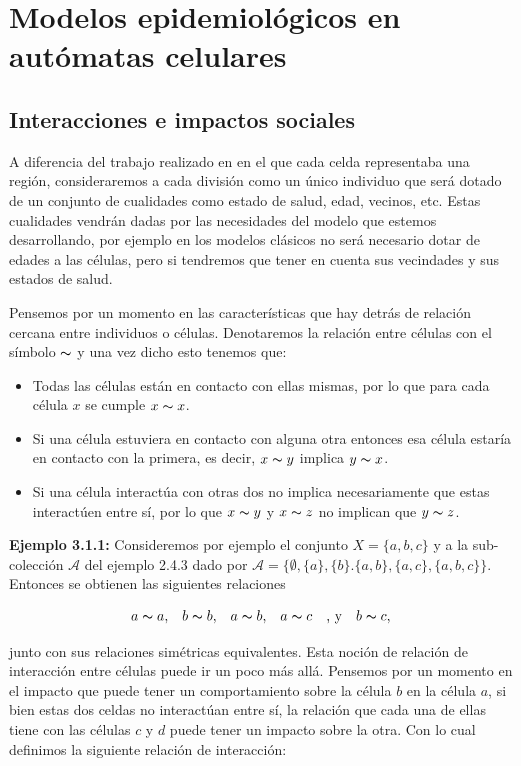\chapter{Modelos epidemiológicos en autómatas celulares}\label{ch:Modelos epidemiológicos en AC}

\section{Interacciones e impactos sociales}
A diferencia del trabajo realizado en \cite{populationDensity} en el que cada celda representaba una región, consideraremos a cada división como un único individuo que será dotado de un conjunto de cualidades como estado de salud, edad, vecinos, etc. Estas cualidades vendrán dadas por las necesidades del modelo que estemos desarrollando, por ejemplo en los modelos clásicos no será necesario dotar de edades a las células, pero si tendremos que tener en cuenta sus vecindades y sus estados de salud.

Pensemos por un momento en las características que hay detrás de relación cercana entre individuos o células. Denotaremos la relación entre células con el símbolo $\thicksim$ y una vez dicho esto tenemos que:

\begin{itemize}
    \item Todas las células están en contacto con ellas mismas, por lo que para cada célula $x$ se cumple $x \thicksim x$.
    \item Si una célula estuviera en contacto con alguna otra entonces esa célula estaría en contacto con la primera, es decir, $x\thicksim y$ implica $y\thicksim x$.
    \item Si una célula interactúa con otras dos no implica necesariamente que estas interactúen entre sí, por lo que $x\thicksim y$ y $x\thicksim z$ no implican que $y\thicksim z$.
\end{itemize}

 \textbf{Ejemplo 3.1.1:} Consideremos por ejemplo el conjunto $X=\{a,b,c\}$ y a la sub-colección $\mathcal{A}$ del ejemplo 2.4.3 dado por $\mathcal{A}=\{\emptyset,\{a\},\{b\}.\{a,b\},\{a,c\},\{a,b,c\}\}$. Entonces se obtienen las siguientes relaciones

$$\begin{array}{cccccc}
    a\thicksim a, & b\thicksim b, & a\thicksim b, & a\thicksim c & \text{, y} & b\thicksim c,
\end{array}$$

junto con sus relaciones simétricas equivalentes. Esta noción de relación de interacción entre células puede ir un poco más allá. Pensemos por un momento en el impacto que puede tener un comportamiento sobre la célula $b$ en la célula $a$, si bien estas dos celdas no interactúan entre sí, la relación que cada una de ellas tiene con las células $c$ y $d$ puede tener un impacto sobre la otra. Con lo cual definimos la siguiente relación de interacción:

